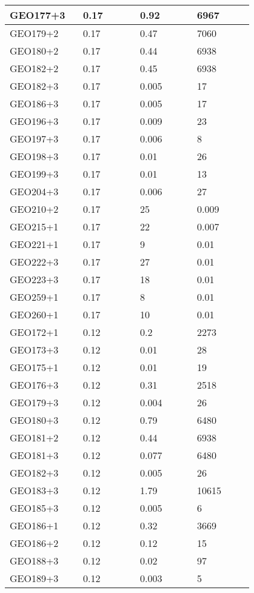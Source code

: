 \begin{longtable}[H]{|p{0.2\linewidth}|p{0.2\linewidth}|p{0.2\linewidth}|p{0.2\linewidth}|}
\hline
GEO177+3 & 0.17 & 0.92 & 6967 \\
\hline
GEO179+2 & 0.17 & 0.47 & 7060 \\
\hline
GEO180+2 & 0.17 & 0.44 & 6938 \\
\hline
GEO182+2 & 0.17 & 0.45 & 6938 \\
\hline
GEO182+3 & 0.17 & 0.005 & 17 \\
\hline
GEO186+3 & 0.17 &  0.005 & 17 \\
\hline
GEO196+3 & 0.17 & 0.009 & 23 \\
\hline
GEO197+3 & 0.17 & 0.006 & 8 \\
\hline
GEO198+3 & 0.17 & 0.01 & 26 \\
\hline
GEO199+3 & 0.17 & 0.01 & 13 \\
\hline
GEO204+3 & 0.17 & 0.006 & 27 \\
\hline
GEO210+2 & 0.17 & 25 & 0.009 \\
\hline
GEO215+1 & 0.17 & 22 & 0.007 \\
\hline
GEO221+1 & 0.17 & 9 & 0.01  \\
\hline
GEO222+3 & 0.17 & 27 & 0.01  \\
\hline
GEO223+3 & 0.17 & 18 & 0.01  \\
\hline
GEO259+1 & 0.17 & 8 & 0.01  \\
\hline
GEO260+1 & 0.17 & 10 & 0.01  \\
\hline
GEO172+1 & 0.12 &  0.2 & 2273 \\
\hline
GEO173+3 & 0.12 &  0.01 & 28 \\
\hline
GEO175+1 & 0.12 &  0.01 & 19 \\
\hline
GEO176+3 & 0.12 &  0.31 & 2518 \\
\hline
GEO179+3 & 0.12 &  0.004 & 26 \\
\hline
GEO180+3 & 0.12 &  0.79 & 6480 \\
\hline
GEO181+2 & 0.12 &  0.44 & 6938 \\
\hline
GEO181+3 & 0.12 &  0.077 & 6480 \\
\hline
GEO182+3 & 0.12 &  0.005 & 26 \\
\hline
GEO183+3 & 0.12 &  1.79 & 10615 \\
\hline
GEO185+3 & 0.12 &  0.005 & 6 \\
\hline
GEO186+1 & 0.12 &  0.32 & 3669 \\
\hline
GEO186+2 & 0.12 &  0.12 & 15 \\
\hline
GEO188+3 & 0.12 &  0.02 & 97 \\
\hline
GEO189+3 & 0.12 &  0.003 & 5 \\

\end{longtable}

